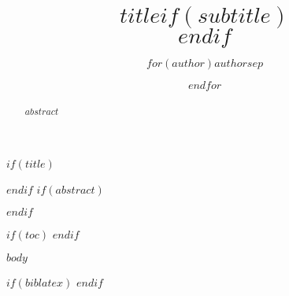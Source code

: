 \documentclass[11pt,a4paper]{article} %
\title{$title$$if(subtitle)$\\\vspace{0.5em}{\large $subtitle$}$endif$}
\author{$for(author)$$author$$sep$ \and $endfor$}
\begin{document}
$if(title)$
\maketitle
$endif$
$if(abstract)$
\begin{abstract}
$abstract$
\end{abstract}
$endif$

$if(toc)$
{
\hypersetup{linkcolor=black}
\setcounter{tocdepth}{2}
\tableofcontents
}
$endif$

$body$

$if(biblatex)$
\printbibliography[title=References]
$endif$
\end{document}
